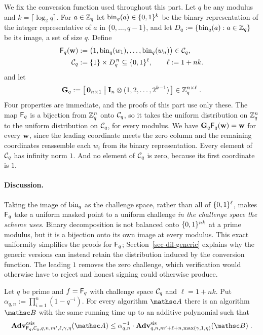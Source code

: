 We fix the conversion function used throughout this part. Let $q$ be any modulus and $k = \lceil\log_2 q\rceil$. For $a \in \mathbb{Z}_q$ let $\mathrm{bin}_q(a) \in \{0,1\}^{k}$ be the binary representation of the integer representative of $a$ in $\{0,\ldots,q-1\}$, and let $D_q := \{\mathrm{bin}_q(a) : a \in \mathbb{Z}_q\}$ be its image, a set of size $q$. Define
$$
\begin{aligned}
\mathsf{F}_q(\mathbf{w}) &:= \big(1, \mathrm{bin}_q(w_1), \ldots, \mathrm{bin}_q(w_n)\big) \in \mathcal{C}_q,\\
\mathcal{C}_q &:= \{1\} \times D_q^{\,n} \subseteq \{0,1\}^{\ell},
\qquad
\ell := 1 + nk.
\end{aligned}
$$
and let
$$
\mathbf{G}_q := \big[\, \mathbf{0}_{n\times 1} \;\big|\; \mathbf{I}_n \otimes (1, 2, \ldots, 2^{k-1}) \,\big] \in \mathbb{Z}_q^{n\times\ell} \;.
$$
Four properties are immediate, and the proofs of this part use only these. The map $\mathsf{F}_q$ is a bijection from $\mathbb{Z}_q^n$ onto $\mathcal{C}_q$, so it takes the uniform distribution on $\mathbb{Z}_q^n$ to the uniform distribution on $\mathcal{C}_q$, for every modulus. We have $\mathbf{G}_q \mathsf{F}_q(\mathbf{w}) = \mathbf{w}$ for every $\mathbf{w}$, since the leading coordinate meets the zero column and the remaining coordinates reassemble each $w_i$ from its binary representation. Every element of $\mathcal{C}_q$ has infinity norm $1$. And no element of $\mathcal{C}_q$ is zero, because its first coordinate is $1$.

\paragraph*{Discussion.} Taking the image of $\mathrm{bin}_q$ as the challenge space, rather than all of $\{0,1\}^{\ell}$, makes $\mathsf{F}_q$ take a uniform masked point to a uniform challenge \emph{in the challenge space the scheme uses}. Binary decomposition is not balanced onto $\{0,1\}^{nk}$ at a prime modulus, but it is a bijection onto its own image at every modulus. This exact uniformity simplifies the proofs for $\mathsf{F}_q$; Section~\ref{sec-dil-generic} explains why the generic versions can instead retain the distribution induced by the conversion function. The leading $1$ removes the zero challenge, which verification would otherwise have to reject and honest signing could otherwise produce.

\begin{lemma} \label{lem-csis-sis}
Let $q$ be prime and $f = \mathsf{F}_q$ with challenge space $\mathcal{C}_q$ and $\ell = 1+nk$. Put $\alpha_{q,n} := \prod_{i=1}^{n}(1-q^{-i})$. For every algorithm $\advA$ there is an algorithm $\advB$ with the same running time up to an additive polynomial such that
$$
\AdvCSIS{\Fq_q,\chal_q,q,n,m',\ell,\gamma,\eta}{\advA}
\le
\alpha_{q,n}^{-1} \cdot \AdvSIS{q,n,m'+\ell+n,\max(\gamma,1,\eta)}{\advB} \;.
$$
\end{lemma}

